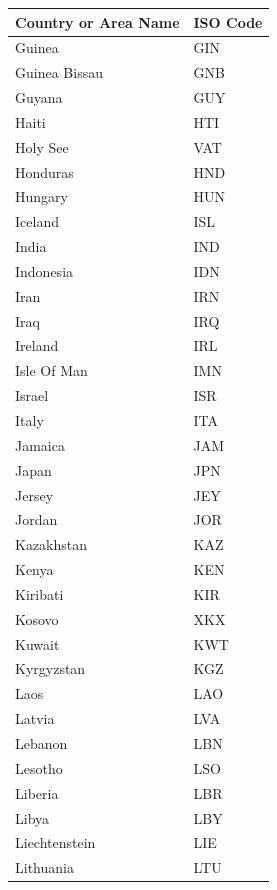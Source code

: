 \documentclass{report}
\begin{document}
\begin{center}
    \newpage
    \begin{minipage}{0.46\textwidth}
        \begin{tabular}{|p{10.5em}|p{6em}|}
            \hline
            Country or Area Name & ISO Code\\
            \hline
            Guinea & GIN\\
            Guinea Bissau & GNB\\
            Guyana & GUY\\
            Haiti & HTI\\
            Holy See & VAT\\
            Honduras & HND\\
            Hungary & HUN\\
            Iceland & ISL\\
            India & IND\\
            Indonesia & IDN\\
            Iran & IRN\\
            Iraq & IRQ\\
            Ireland & IRL\\
            Isle Of Man & IMN\\
            Israel & ISR\\
            Italy & ITA\\
            Jamaica & JAM\\
            Japan & JPN\\
            Jersey & JEY\\
            Jordan & JOR\\
            Kazakhstan & KAZ\\
            Kenya & KEN\\
            Kiribati & KIR\\
            Kosovo & XKX\\
            Kuwait & KWT\\
            Kyrgyzstan & KGZ\\
            Laos & LAO\\
            Latvia & LVA\\
            Lebanon & LBN\\
            Lesotho & LSO\\
            Liberia & LBR\\
            Libya & LBY\\
            Liechtenstein & LIE\\
            Lithuania & LTU\\

\end{tabular}
\end{minipage}
\end{center}
\end{document}

